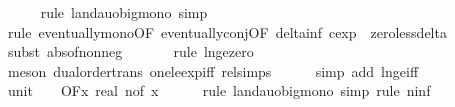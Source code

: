 \begin{isabellebody}
\ \ \ \ \isamarkupfalse%
\ {\isacharparenleft}{\kern0pt}rule\ landau{\isacharunderscore}{\kern0pt}o{\isachardot}{\kern0pt}big{\isacharunderscore}{\kern0pt}mono{\isacharcomma}{\kern0pt}\ simp{\isacharparenright}{\kern0pt}\isanewline
\ \ \ \ \isamarkupfalse%
\ {\isacharparenleft}{\kern0pt}rule\ eventually{\isacharunderscore}{\kern0pt}mono{\isacharbrackleft}{\kern0pt}OF\ eventually{\isacharunderscore}{\kern0pt}conj{\isacharbrackleft}{\kern0pt}OF\ delta{\isacharunderscore}{\kern0pt}inf{\isacharbrackleft}{\kern0pt}\ c{\isacharequal}{\kern0pt}{\isachardoublequoteopen}exp\ {}{\isachardoublequoteclose}{\isacharbrackright}{\kern0pt}\ zero{\isacharunderscore}{\kern0pt}less{\isacharunderscore}{\kern0pt}delta{\isacharbrackright}{\kern0pt}{\isacharbrackright}{\kern0pt}{\isacharparenright}{\kern0pt}\isanewline
\ \ \ \ \isamarkupfalse%
\ {\isacharparenleft}{\kern0pt}subst\ abs{\isacharunderscore}{\kern0pt}of{\isacharunderscore}{\kern0pt}nonneg{\isacharparenright}{\kern0pt}\isanewline
\ \ \ \ \ \isamarkupfalse%
\ {\isacharparenleft}{\kern0pt}rule\ ln{\isacharunderscore}{\kern0pt}ge{\isacharunderscore}{\kern0pt}zero{\isacharparenright}{\kern0pt}\isanewline
\ \ \ \ \isamarkupfalse%
\ {\isacharparenleft}{\kern0pt}meson\ dual{\isacharunderscore}{\kern0pt}order{\isachardot}{\kern0pt}trans\ one{\isacharunderscore}{\kern0pt}le{\isacharunderscore}{\kern0pt}exp{\isacharunderscore}{\kern0pt}iff\ rel{\isacharunderscore}{\kern0pt}simps{\isacharparenleft}{\kern0pt}{}{}{\isacharparenright}{\kern0pt}{\isacharparenright}{\kern0pt}\isanewline
\ \ \ \ \isamarkupfalse%
\ {\isacharparenleft}{\kern0pt}simp\ add{\isacharcolon}{\kern0pt}\ ln{\isacharunderscore}{\kern0pt}ge{\isacharunderscore}{\kern0pt}iff{\isacharparenright}{\kern0pt}\isanewline
\isanewline
\ \ \isamarkupfalse%
\ unit{\isacharunderscore}{\kern0pt}{}{\isacharcolon}{\kern0pt}\ {\isachardoublequoteopen}{\isacharparenleft}{\kern0pt}{\isasymlambda}{\isacharunderscore}{\kern0pt}{\isachardot}{\kern0pt}\ {}{\isacharparenright}{\kern0pt}\ {\isasymin}\ O{\isacharbrackleft}{\kern0pt}{\isacharquery}{\kern0pt}F{\isacharbrackright}{\kern0pt}{\isacharparenleft}{\kern0pt}{\isasymlambda}x{\isachardot}{\kern0pt}\ real\ {\isacharparenleft}{\kern0pt}n{\isacharunderscore}{\kern0pt}of\ x{\isacharparenright}{\kern0pt}{\isacharparenright}{\kern0pt}{\isachardoublequoteclose}\isanewline
\ \ \ \ \isamarkupfalse%
\ {\isacharparenleft}{\kern0pt}rule\ landau{\isacharunderscore}{\kern0pt}o{\isachardot}{\kern0pt}big{\isacharunderscore}{\kern0pt}mono{\isacharcomma}{\kern0pt}\ simp{\isacharcomma}{\kern0pt}\ rule\ n{\isacharunderscore}{\kern0pt}inf{\isacharparenright}{\kern0pt}\isanewline

\end{isabellebody}
